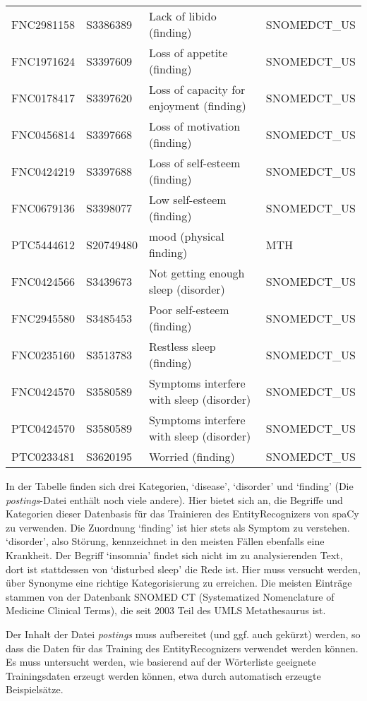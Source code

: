 \begin{center}
\begin{tabular}{llll}
FNC2981158 &	S3386389 &	Lack of libido (finding) & SNOMEDCT\_US \\
FNC1971624 &	S3397609 &	Loss of appetite (finding) & SNOMEDCT\_US \\
FNC0178417 &	S3397620 &	\parbox[t]{5cm}{Loss of capacity for enjoyment (finding)} & SNOMEDCT\_US \\
FNC0456814 &	S3397668 &	Loss of motivation (finding)  & SNOMEDCT\_US \\
FNC0424219 &	S3397688 &	Loss of self-esteem (finding) & SNOMEDCT\_US \\
FNC0679136 &	S3398077 &	Low self-esteem (finding) & SNOMEDCT\_US \\
PTC5444612 &	S20749480 & mood (physical finding) & MTH \\
FNC0424566 &	S3439673 &	\parbox[t]{5cm}{Not getting enough sleep (disorder)} &	SNOMEDCT\_US \\
FNC2945580 &	S3485453 &	Poor self-esteem (finding) &	SNOMEDCT\_US \\
FNC0235160 &	S3513783 &	Restless sleep (finding) & SNOMEDCT\_US \\
FNC0424570 &	S3580589 &	\parbox[t]{5cm}{Symptoms interfere with sleep (disorder)} & SNOMEDCT\_US \\
PTC0424570 &	S3580589 &	\parbox[t]{5cm}{Symptoms interfere with sleep (disorder)} & SNOMEDCT\_US \\
PTC0233481 &	S3620195 &	Worried (finding) & SNOMEDCT\_US \\
\hline
\end{tabular}
\end{center}

In der Tabelle finden sich drei Kategorien, `disease', `disorder' und `finding' (Die \emph{postings}-Datei enthält noch viele andere). Hier bietet sich an, die Begriffe und Kategorien dieser Datenbasis für das Trainieren des EntityRecognizers von spaCy zu verwenden. Die Zuordnung `finding' ist hier stets als Symptom zu verstehen. `disorder', also Störung, kennzeichnet in den meisten Fällen ebenfalls eine Krankheit. Der Begriff `insomnia' findet sich nicht im zu analysierenden Text, dort ist stattdessen von `disturbed sleep' die Rede ist. Hier muss versucht werden, über Synonyme eine richtige Kategorisierung zu erreichen. Die meisten Einträge stammen von der Datenbank SNOMED CT (Systematized Nomenclature of Medicine Clinical Terms), die seit 2003 Teil des UMLS Metathesaurus ist. 

Der Inhalt der Datei \emph{postings} muss aufbereitet (und ggf. auch gekürzt) werden, so dass die Daten für das Training des EntityRecognizers verwendet werden können. Es muss untersucht werden, wie basierend auf der Wörterliste geeignete Trainingsdaten erzeugt werden können, etwa durch automatisch erzeugte Beispielsätze.

